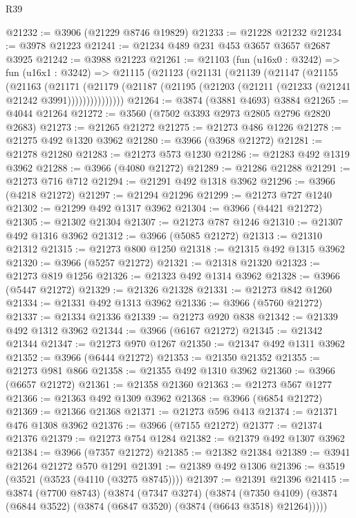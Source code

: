\begin{lexlean}{R39}
\begin{coremodule}
@21232 := @3906 (@21229 @8746 @19829)
@21233 := @21228 @21232
@21234 := @3978 @21223
@21241 := @21234 @489 @231 @453 @3657 @3657 @2687 @3925
@21242 := @3988 @21223
@21261 := @21103
    (fun (u16x0 : @3242) =>
    fun (u16x1 : @3242) =>
    @21115
      (@21123
        (@21131
          (@21139
            (@21147
              (@21155
                (@21163
                  (@21171
                    (@21179
                      (@21187 (@21195 (@21203 (@21211 (@21233 (@21241 @21242 @3991)))))))))))))))
@21264 := @3874 (@3881 @4693) @3884
@21265 := @4044 @21264
@21272 := @3560 (@7502 @3393 @2973 @2805 @2796 @2820 @2683)
@21273 := @21265 @21272
@21275 := @21273 @486 @1226
@21278 := @21275 @492 @1320 @3962
@21280 := @3966 (@3968 @21272)
@21281 := @21278 @21280
@21283 := @21273 @573 @1230
@21286 := @21283 @492 @1319 @3962
@21288 := @3966 (@4080 @21272)
@21289 := @21286 @21288
@21291 := @21273 @716 @712
@21294 := @21291 @492 @1318 @3962
@21296 := @3966 (@4218 @21272)
@21297 := @21294 @21296
@21299 := @21273 @727 @1240
@21302 := @21299 @492 @1317 @3962
@21304 := @3966 (@4421 @21272)
@21305 := @21302 @21304
@21307 := @21273 @787 @1246
@21310 := @21307 @492 @1316 @3962
@21312 := @3966 (@5085 @21272)
@21313 := @21310 @21312
@21315 := @21273 @800 @1250
@21318 := @21315 @492 @1315 @3962
@21320 := @3966 (@5257 @21272)
@21321 := @21318 @21320
@21323 := @21273 @819 @1256
@21326 := @21323 @492 @1314 @3962
@21328 := @3966 (@5447 @21272)
@21329 := @21326 @21328
@21331 := @21273 @842 @1260
@21334 := @21331 @492 @1313 @3962
@21336 := @3966 (@5760 @21272)
@21337 := @21334 @21336
@21339 := @21273 @920 @838
@21342 := @21339 @492 @1312 @3962
@21344 := @3966 (@6167 @21272)
@21345 := @21342 @21344
@21347 := @21273 @970 @1267
@21350 := @21347 @492 @1311 @3962
@21352 := @3966 (@6444 @21272)
@21353 := @21350 @21352
@21355 := @21273 @981 @866
@21358 := @21355 @492 @1310 @3962
@21360 := @3966 (@6657 @21272)
@21361 := @21358 @21360
@21363 := @21273 @567 @1277
@21366 := @21363 @492 @1309 @3962
@21368 := @3966 (@6854 @21272)
@21369 := @21366 @21368
@21371 := @21273 @596 @413
@21374 := @21371 @476 @1308 @3962
@21376 := @3966 (@7155 @21272)
@21377 := @21374 @21376
@21379 := @21273 @754 @1284
@21382 := @21379 @492 @1307 @3962
@21384 := @3966 (@7357 @21272)
@21385 := @21382 @21384
@21389 := @3941 @21264 @21272 @570 @1291
@21391 := @21389 @492 @1306
@21396 := @3519 (@3521 (@3523 (@4110 (@3275 @8745))))
@21397 := @21391 @21396
@21415 := @3874
    (@7700 @8743)
    (@3874
      (@7347 @3274)
      (@3874
        (@7350 @4109)
        (@3874 (@6844 @3522) (@3874 (@6847 @3520) (@3874 (@6643 @3518) @21264)))))

\end{coremodule}
\end{lexlean}
